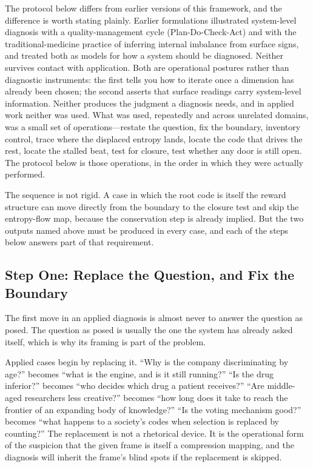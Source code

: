 \documentclass[11pt,a4paper]{article}
\begin{document}
The protocol below differs from earlier versions of this framework, and the difference is worth stating plainly. Earlier formulations illustrated system-level diagnosis with a quality-management cycle (Plan-Do-Check-Act) and with the traditional-medicine practice of inferring internal imbalance from surface signs, and treated both as models for how a system should be diagnosed. Neither survives contact with application. Both are operational postures rather than diagnostic instruments: the first tells you how to iterate once a dimension has already been chosen; the second asserts that surface readings carry system-level information. Neither produces the judgment a diagnosis needs, and in applied work neither was used. What was used, repeatedly and across unrelated domains, was a small set of operations---restate the question, fix the boundary, inventory control, trace where the displaced entropy lands, locate the code that drives the rest, locate the stalled beat, test for closure, test whether any door is still open. The protocol below is those operations, in the order in which they were actually performed.

The sequence is not rigid. A case in which the root code is itself the reward structure can move directly from the boundary to the closure test and skip the entropy-flow map, because the conservation step is already implied. But the two outputs named above must be produced in every case, and each of the steps below answers part of that requirement.

\subsection{Step One: Replace the Question, and Fix the Boundary}

The first move in an applied diagnosis is almost never to answer the question as posed. The question as posed is usually the one the system has already asked itself, which is why its framing is part of the problem.

Applied cases begin by replacing it. ``Why is the company discriminating by age?'' becomes ``what is the engine, and is it still running?'' ``Is the drug inferior?'' becomes ``who decides which drug a patient receives?'' ``Are middle-aged researchers less creative?'' becomes ``how long does it take to reach the frontier of an expanding body of knowledge?'' ``Is the voting mechanism good?'' becomes ``what happens to a society's codes when selection is replaced by counting?'' The replacement is not a rhetorical device. It is the operational form of the suspicion that the given frame is itself a compression mapping, and the diagnosis will inherit the frame's blind spots if the replacement is skipped.
\end{document}

